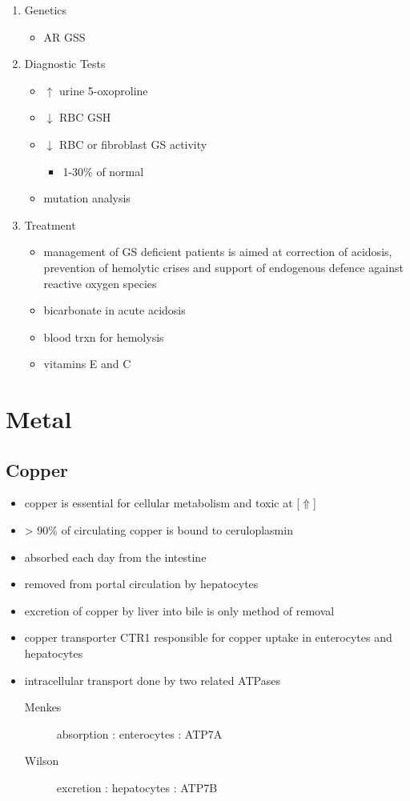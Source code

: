 \documentclass[12pt]{scrartcl}
\begin{document}
\begin{enumerate}
\item Genetics
\label{sec:org7cf3bbb}
\begin{itemize}
\item AR GSS
\end{itemize}

\item Diagnostic Tests
\label{sec:orgf434999}
\begin{itemize}
\item \(\uparrow\) urine 5-oxoproline
\item \(\downarrow\) RBC GSH
\item \(\downarrow\) RBC or fibroblast GS activity
\begin{itemize}
\item 1-30\% of normal
\end{itemize}
\item mutation analysis
\end{itemize}

\item Treatment
\label{sec:orgee67b6b}
\begin{itemize}
\item management of GS deficient patients is aimed at correction of
acidosis, prevention of hemolytic crises and support of endogenous
defence against reactive oxygen species
\item bicarbonate in acute acidosis
\item blood trxn for hemolysis
\item vitamins E and C
\end{itemize}
\end{enumerate}
\section{Metal}
\label{sec:orgcf37367}
\subsection{Copper}
\label{sec:org4f5fcd6}
\begin{itemize}
\item copper is essential for cellular metabolism and toxic at [\(\Uparrow\)]
\item \textgreater{} 90\% of circulating copper is bound to ceruloplasmin
\item absorbed each day from the intestine
\item removed from portal circulation by hepatocytes
\item excretion of copper by liver into bile is only method of removal
\item copper transporter CTR1 responsible for copper uptake in enterocytes and hepatocytes
\item intracellular transport done by two related ATPases
\begin{description}
\item[{Menkes}] absorption : enterocytes : ATP7A
\item[{Wilson}] excretion : hepatocytes : ATP7B
\end{description}
\end{itemize}
\end{document}

